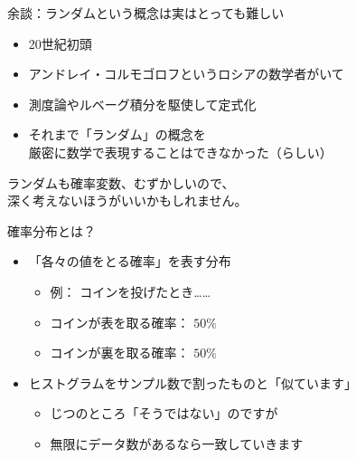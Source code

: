 \documentclass[dvipdfmx,cjk]{beamer}
\begin{document}
\begin{frame}{余談：ランダムという概念は実はとっても難しい}


\begin{itemize}
    \item 20世紀初頭
    \item アンドレイ・コルモゴロフというロシアの数学者がいて
    \item 測度論やルベーグ積分を駆使して定式化
    \item それまで「ランダム」の概念を\\厳密に数学で表現することはできなかった（らしい）
\end{itemize}

\vskip 1cm

ランダムも確率変数、むずかしいので、\\
深く考えないほうがいいかもしれません。


\end{frame}


\begin{frame}{確率分布とは？}

\begin{itemize}

    \item 「各々の値をとる確率」を表す分布
        \begin{itemize}
        \item 例： コインを投げたとき……
        \item コインが表を取る確率： $50\%$
        \item コインが裏を取る確率： $50\%$
        \end{itemize}

    \item ヒストグラムをサンプル数で割ったものと「似ています」
        \begin{itemize}
        \item じつのところ「そうではない」のですが
        \item 無限にデータ数があるなら一致していきます
        \end{itemize}

\end{itemize}

\end{frame}
\end{document}
